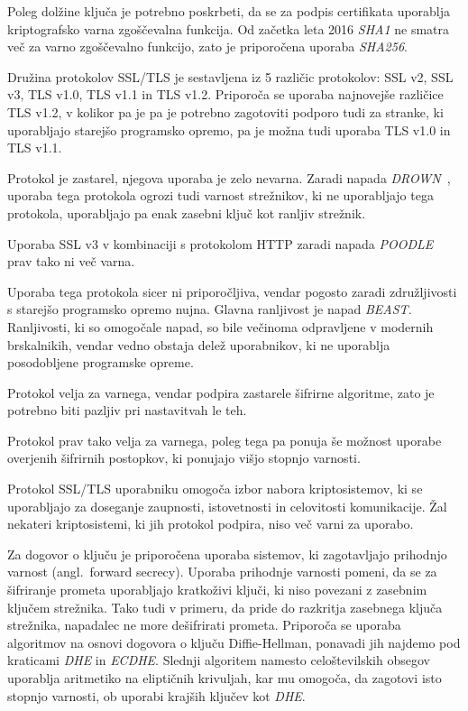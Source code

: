 \documentclass[12pt,a4paper,openany,tikz]{book}
\theoremstyle{plain}
\theoremstyle{definition}
\begin{document}
Poleg dolžine ključa je potrebno poskrbeti, da se za podpis certifikata uporablja kriptografsko varna zgoščevalna funkcija. Od začetka leta 2016 \textit{SHA1} ne smatra več za varno zgoščevalno funkcijo, zato je priporočena uporaba \textit{SHA256}.

Družina protokolov SSL/TLS je sestavljena iz 5 različic protokolov: SSL v2, SSL v3, TLS v1.0, TLS v1.1 in TLS v1.2. Priporoča se uporaba najnovejše različice TLS v1.2, v kolikor pa je pa je potrebno zagotoviti podporo tudi za stranke, ki uporabljajo starejšo programsko opremo, pa je možna tudi uporaba TLS v1.0 in TLS v1.1.

\begin{mdframed}[frametitle=Pregled različic protokola SSL/TLS]
  \begin{description}[style=nextline]
    \item[SSL v2] Protokol je zastarel, njegova uporaba je zelo nevarna. Zaradi napada \textit{DROWN}~\cite{aviramdrown}, uporaba tega protokola ogrozi tudi varnost strežnikov, ki ne uporabljajo tega protokola, uporabljajo pa enak zasebni ključ kot ranljiv strežnik.
    \item[SSL v3] Uporaba SSL v3 v kombinaciji s protokolom HTTP zaradi napada \textit{POODLE}~\cite{moller2014poodle} prav tako ni več varna.
    \item[TLS v1.0] Uporaba tega protokola sicer ni priporočljiva, vendar pogosto zaradi združljivosti s starejšo programsko opremo nujna. Glavna ranljivost je napad \textit{BEAST}. Ranljivosti, ki so omogočale napad, so bile večinoma odpravljene v modernih brskalnikih, vendar vedno obstaja delež uporabnikov, ki ne uporablja posodobljene programske opreme.
    \item[TLS v1.1] Protokol velja za varnega, vendar podpira zastarele šifrirne algoritme, zato je potrebno biti pazljiv pri nastavitvah le teh.
    \item[TLS v1.2] Protokol prav tako velja za varnega, poleg tega pa ponuja še možnost uporabe overjenih šifrirnih postopkov, ki ponujajo višjo stopnjo varnosti.
  \end{description}
\end{mdframed}


Protokol SSL/TLS uporabniku omogoča izbor nabora kriptosistemov, ki se uporabljajo za doseganje zaupnosti, istovetnosti in celovitosti komunikacije. Žal nekateri kriptosistemi, ki jih protokol podpira, niso več varni za uporabo.

Za dogovor o ključu je priporočena uporaba sistemov, ki zagotavljajo prihodnjo varnost (angl.\ forward secrecy). Uporaba prihodnje varnosti pomeni, da se za šifriranje prometa uporabljajo kratkoživi ključi, ki niso povezani z zasebnim ključem strežnika. Tako tudi v primeru, da pride do razkritja zasebnega ključa strežnika, napadalec ne more dešifrirati prometa. Priporoča se uporaba algoritmov na osnovi dogovora o ključu Diffie-Hellman, ponavadi jih najdemo pod kraticami \textit{DHE} in \textit{ECDHE}. Slednji algoritem namesto celoštevilskih obsegov uporablja aritmetiko na eliptičnih krivuljah, kar mu omogoča, da zagotovi isto stopnjo varnosti, ob uporabi krajših ključev kot \textit{DHE}.
\end{document}
